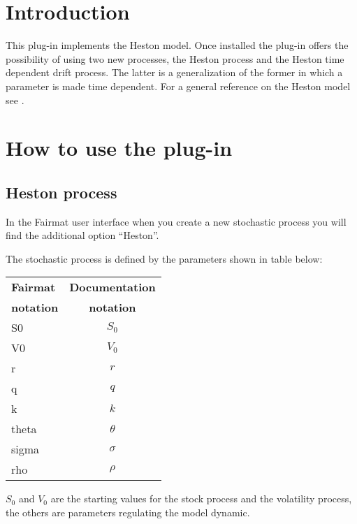 \newcommand{\pluginName}{Heston Model}
\newcommand{\pluginVersion}{1.0.9}





\PluginTitle{\pluginName}{\pluginVersion}

\section{Introduction}
This plug-in implements the Heston model. Once installed the plug-in offers the possibility of using two new processes, the Heston process and the Heston time dependent drift process. The latter is a generalization of the former in which a parameter is made time dependent. For a general reference on the Heston model see \cite{Heston:ClosedFormSol}.

\section{How to use the plug-in}

\subsection{Heston process}

In the Fairmat user interface when you create a new stochastic process you will find the additional option ``Heston''.

The stochastic process is defined by the parameters shown in table below:
\begin{center}
\begin{tabular}{|l|c|}
  \hline
\textbf{Fairmat}&\textbf{Documentation}\\
\textbf{notation}&\textbf{notation}\\
                     \hline
 S0     & $S_0$\\
 V0     & $V_0$\\
 r  & $r$\\
 q  & $q$\\
 k      & $k$ \\
 theta  & $\theta$\\
 sigma  & $\sigma$\\
rho & $\rho$ \\ 
   \hline
\end{tabular}
\end{center}
$S_0$ and $V_0$ are the starting values for the stock process and the volatility process, the others are parameters regulating the model dynamic.

